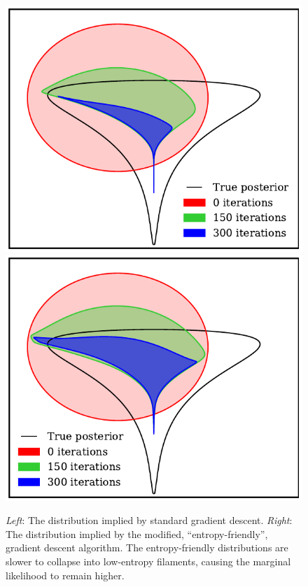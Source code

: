 \documentclass[]{article}
\begin{document}
\begin{figure}
\begin{center}
\includegraphics[width=0.9\columnwidth]{../experiments/2015_03_02_funnel/2/dists.pdf} \hspace{1cm}
\includegraphics[width=0.9\columnwidth]{../experiments/2015_03_02_funnel/3_grad_threshold/dists.pdf}
\caption{\emph{Left}: The distribution implied by standard gradient descent.
\emph{Right}: The distribution implied by the modified, ``entropy-friendly'', gradient descent algorithm.
The entropy-friendly distributions are slower to collapse into low-entropy filaments, causing the marginal likelihood to remain higher.}
\label{fig:cartoon-fatter}
\end{center}
\end{figure}
\end{document}
